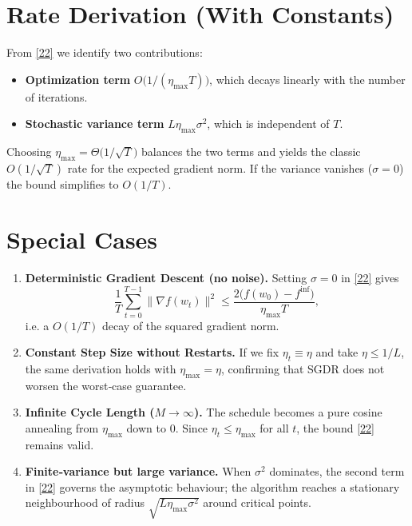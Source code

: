 \documentclass{article}
\begin{document}
\section*{Rate Derivation (With Constants)}
From \eqref{22} we identify two contributions:
\begin{itemize}
\item \textbf{Optimization term} $O\!\bigl(1/(\eta_{\max}T)\bigr)$, which decays linearly with the number of iterations.
\item \textbf{Stochastic variance term} $L\eta_{\max}\sigma^{2}$, which is independent of $T$.
\end{itemize}
Choosing $\eta_{\max}= \Theta\!\bigl(1/\sqrt{T}\bigr)$ balances the two terms and yields the classic $O(1/\sqrt{T})$ rate for the expected gradient norm. If the variance vanishes ($\sigma=0$) the bound simplifies to $O(1/T)$.

\section*{Special Cases}
\begin{enumerate}[label=\alph*.]
\item \textbf{Deterministic Gradient Descent (no noise).} Setting $\sigma=0$ in \eqref{22} gives
\[
\frac{1}{T}\sum_{t=0}^{T-1}\|\nabla f(w_{t})\|^{2}
\le \frac{2\bigl(f(w_{0})-f^{\inf}\bigr)}{\eta_{\max}T},
\]
i.e. a $O(1/T)$ decay of the squared gradient norm.

\item \textbf{Constant Step Size without Restarts.} If we fix $\eta_{t}\equiv\eta$ and take $\eta\le 1/L$, the same derivation holds with $\eta_{\max}=\eta$, confirming that SGDR does not worsen the worst‑case guarantee.

\item \textbf{Infinite Cycle Length ($M\to\infty$).} The schedule becomes a pure cosine annealing from $\eta_{\max}$ down to $0$. Since $\eta_{t}\le\eta_{\max}$ for all $t$, the bound \eqref{22} remains valid.

\item \textbf{Finite‑variance but large variance.} When $\sigma^{2}$ dominates, the second term in \eqref{22} governs the asymptotic behaviour; the algorithm reaches a stationary neighbourhood of radius $\sqrt{L\eta_{\max}\sigma^{2}}$ around critical points.
\end{enumerate}
\end{document}
